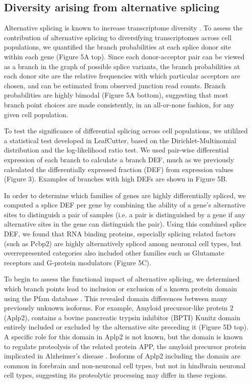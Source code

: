 \subsection{Diversity arising from alternative splicing}

Alternative splicing is known to increase transcriptome diversity \citep{ Andreadis_1987}. To assess the contribution of alternative splicing to diversifying transcriptomes across cell populations, we quantified the branch probabilities at each splice donor site within each gene (Figure 5A top). Since each donor-acceptor pair can be viewed as a branch in the graph of possible splice variants, the branch probabilities at each donor site are the relative frequencies with which particular acceptors are chosen, and can be estimated from observed junction read counts. Branch probabilities are highly bimodal (Figure 5A bottom), suggesting that most branch point choices are made consistently, in an all-or-none fashion, for any given cell population.

To test the significance of differential splicing across cell populations, we utililzed a statistical test developed in LeafCutter\citep{Li_2016}, based on the Dirichlet-Multinomial distribution and the log-likelihood ratio test. We used pair-wise differential expression of each branch to calculate a branch DEF, much as we previously calculated the differentially expressed fraction (DEF) from expression values (Figure 3). Examples of branches with high DEFs are shown in Figure 5B. 

In order to determine which families of genes are highly differentially spliced, we computed a splice DEF per gene by combining the ability of a gene’s alternative sites to distinguish a pair of samples (i.e. a pair is distinguished by a gene if any alternative sites in the gene can distinguish the pair). Using this combined splice DEF, we found that RNA binding proteins, especially splicing related factors (such as Pcbp2) are highly alternatively spliced among neuronal cell types, but overrepresented categories also included other families such as Glutamate receptors and G-protein modulators (Figure 5C). 

To begin to assess the functional impact of alternative splicing, we determined which branch points lead to inclusion or exclusion of a known protein domain using the Pfam database \citep{Finn_2015}. This revealed domain differences between many previously unknown isoforms. For example, Amyloid precursor-like protein 2 (Aplp2), contains a bovine pancreatic trypsin inhibitor (BPTI) Kunitz domain entirely included or excluded by the alternative site preceding it (Figure 5D top). A specific role for this domain in Aplp2 is not known, but the domain is known to regulate proteolysis of the related protein APP, the amyloid precursor protein implicated in Alzheimer's disease \citep{Beckmann_2016}. Isoforms of Aplp2 including the domain are common in forebrain and non-neuronal cell types, but not in hindbrain neuronal cell types, suggesting its proteolytic processing may differ in these regions.

